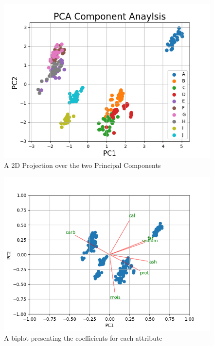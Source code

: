 \documentclass[preprint,12pt]{elsarticle}
\begin{document}
\begin{figure}[hb]
	\centering
    \centerline{\includegraphics[scale=0.6]{figs/pca_projection.png}}
    \caption{A 2D Projection over the  two Principal Components}\label{fig:pca_projection.png}
\end{figure}

\begin{figure}[hb]
	\centering
    \centerline{\includegraphics[scale=0.6]{figs/bi_plot.png}}
    \caption{A biplot presenting the coefficients for each attribute}\label{fig:bi_plot.png}
\end{figure}
\end{document}
